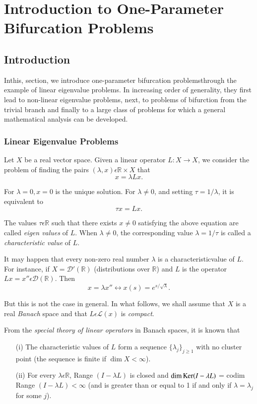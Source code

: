 
\chapter{Introduction to One-Parameter Bifurcation Problems}\label{chap1}


\section{Introduction}\label{chap1-sec1}

In\pageoriginale this, section, we introduce one-parameter bifurcation problems\break through the example of linear eigenvalue problems. In increasing order of generality, they first lead to non-linear eigenvalue problems, next, to problems of bifurction from the trivial branch and finally to a large class of problems for which a general mathematical analysis can be developed.

\subsection{Linear Eigenvalue Problems}\label{chap1-subsec1.1a}

Let $X$ be a real vector space. Given a linear operator $L : X \to X$, we consider the problem of finding the pairs $(\lambda, x) \epsilon \mathbb{R} \times X$ that
$$
x = \lambda L x.
$$

For $\lambda = 0, x = 0$ is the unique solution. For $\lambda \neq 0$, and setting $\tau = 1 / \lambda$, it is equivalent to
$$
\tau x = L x.
$$

The values $\tau \epsilon \mathbb{R}$ such that there exists $x \neq 0$ satisfying the above equation are called {\em eigen values} of $L$. When $\lambda \neq 0$, the corresponding value $\lambda = 1/\tau$ is called a {\em characteristic value } of $L$.

It may happen that every non-zero real number $\lambda$ is a characteristic\pageoriginale value of $L$. For instance, if $X = \mathscr{D}' (\mathbb{R})$ (distributions over $\mathbb{R}$) and $L$ is the operator $Lx = x'' \epsilon \mathscr{D} (\mathbb{R})$. Then
$$
x = \lambda x'' \leftrightarrow x(s) = e^{s / \surd \lambda}.
$$

But this is not the case in general. In what follows, we shall assume that $X$ is a real {\em Banach} space and that $L \epsilon \mathscr{L} (x)$ is {\em compact}.

From the {\em special theory of linear operators} in Banach spaces, it is known that
\begin{enumerate}
\item[(i)] The characteristic values of $L$ form a sequence $\{\lambda_{j}\}_{ j\geq 1}$ with no cluster point (the sequence is finite if $\dim X < \infty$).

\item[(ii)] For every $\lambda \epsilon \mathbb{R}$, Range $(I - \lambda L)$ is closed and $\dim \operatorname{Ker} (I - \lambda L)$ = codim Range $(I - \lambda L) < \infty$ (and is greater than or equal to 1 if and only if $\lambda = \lambda_{j}$ for some $j$).
\end{enumerate}


